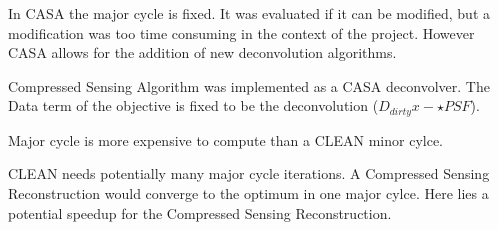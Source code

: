 In CASA the major cycle is fixed. It was evaluated if it can be modified, but a modification was too time consuming in the context of the project. However CASA allows for the addition of new deconvolution algorithms. 

Compressed Sensing Algorithm was implemented as a CASA deconvolver. The Data term of the objective is fixed to be the deconvolution ($D_{dirty} x - \star PSF$). 


Major cycle is more expensive to compute than a CLEAN minor cylce. 

CLEAN needs potentially many major cycle iterations. A Compressed Sensing Reconstruction would converge to the optimum in one major cylce. Here lies a potential speedup for the Compressed Sensing Reconstruction.







 
